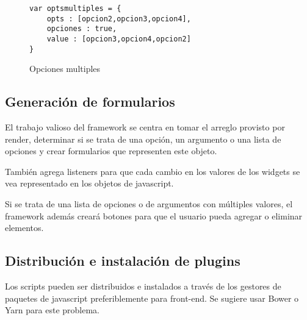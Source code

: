 \begin{figure}
\begin{lstlisting}
var optsmultiples = {
    opts : [opcion2,opcion3,opcion4],
    opciones : true,
    value : [opcion3,opcion4,opcion2]
}
\end{lstlisting}
\caption{Opciones multiples}
\end{figure}

\subsection{Generación de formularios}
El trabajo valioso del framework se centra en tomar el arreglo provisto por render, determinar si se trata de una opción, un argumento o una lista de opciones y crear formularios que representen este objeto.

\begin{table}[ht]
\centering
{}
\end{table}

También agrega listeners para que cada cambio en los valores de los widgets se vea representado en los objetos de javascript.


Si se trata de una lista de opciones o de argumentos con múltiples valores, el framework además creará botones para que el usuario pueda agregar o eliminar elementos.


\subsection{Distribución e instalación de plugins}
Los scripts pueden ser distribuidos e instalados a través de los gestores de paquetes de javascript preferiblemente para front-end. Se sugiere usar Bower o Yarn para este problema.

